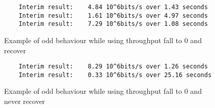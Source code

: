     \begin{figure}[bthp]
    \begin{lstlisting}
    Interim result:    4.84 10^6bits/s over 1.43 seconds
    Interim result:    1.61 10^6bits/s over 4.97 seconds
    Interim result:    7.29 10^6bits/s over 1.08 seconds
    \end{lstlisting}
    \caption{Example of odd behaviour while using \olsr\: throughput fall
      to 0 and recover}
    \label{lst:netperf-olsr-recover}
    \end{figure}

    \begin{figure}[bthp]
    \begin{lstlisting}
    Interim result:    8.29 10^6bits/s over 1.26 seconds
    Interim result:    0.33 10^6bits/s over 25.16 seconds
    \end{lstlisting}
    \caption{Example of odd behaviour while using \olsr\: throughput fall
      to 0 and never recover}
    \label{lst:netperf-olsr-zero}
    \end{figure}

